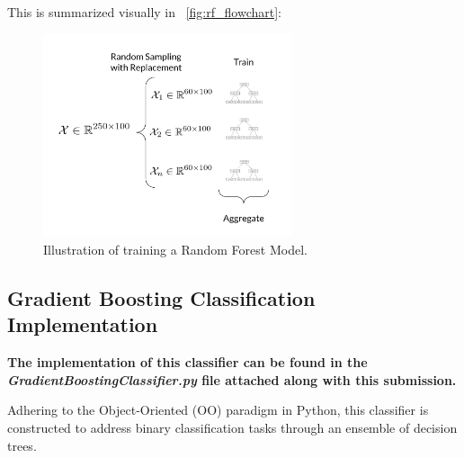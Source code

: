 \begin{appendices}
    This is summarized visually in ~\autoref{fig:rf_flowchart}:
    
    \begin{figure}[H]
      \centering
      \includegraphics[width=0.65\textwidth]{images/rf_train.png}
      \caption[Illustration of training a Random Forest Model.]{Illustration of training a Random Forest Model.\protect \footnotemark}
      \label{fig:rf_flowchart}
    \end{figure}
    \FloatBarrier
    
    \subsection{Gradient Boosting Classification Implementation} \label{app:sec:gb_implementation}
    
  \textbf{The implementation of this classifier can be found in the \textit{GradientBoostingClassifier.py} file attached along with this submission.}

  Adhering to the Object-Oriented (OO) paradigm in Python, this classifier is constructed to address binary classification tasks through an ensemble of decision trees.


\end{appendices}
